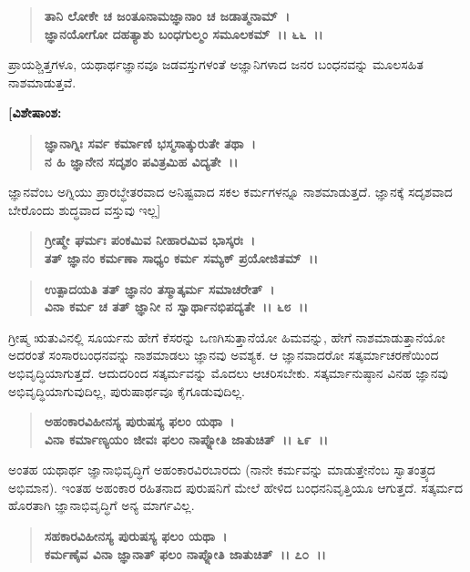 \begin{verse}
\textbf{ತಾನಿ ಲೋಕೇ ಚ ಜಂತೂನಾಮಜ್ಞಾನಾಂ ಚ ಜಡಾತ್ಮನಾಮ್~।}\\\textbf{ಜ್ಞಾನಯೋಗೋ ದಹತ್ಯಾಶು ಬಂಧಗುಲ್ಮಂ ಸಮೂಲಕಮ್~।। ೬೬~।।}
\end{verse}

ಪ್ರಾಯಶ್ಚಿತ್ತಗಳೂ, ಯಥಾರ್ಥಜ್ಞಾನವೂ ಜಡವಸ್ತುಗಳಂತೆ ಅಜ್ಞಾನಿಗಳಾದ ಜನರ ಬಂಧನವನ್ನು ಮೂಲಸಹಿತ ನಾಶಮಾಡುತ್ತವೆ.

\textbf{[ವಿಶೇಷಾಂಶ:}

\begin{verse}
\textbf{ಜ್ಞಾನಾಗ್ನಿಃ ಸರ್ವ ಕರ್ಮಾಣಿ ಭಸ್ಮಸಾತ್ಕುರುತೇ ತಥಾ~।}\\\textbf{ನ ಹಿ ಜ್ಞಾನೇನ ಸದೃಶಂ ಪವಿತ್ರಮಿಹ ವಿದ್ಯತೇ~।।} 
\end{verse}

ಜ್ಞಾನವೆಂಬ ಅಗ್ನಿಯು ಪ್ರಾರಬ್ಧೇತರವಾದ ಅನಿಷ್ಟವಾದ ಸಕಲ ಕರ್ಮಗಳನ್ನೂ ನಾಶಮಾಡುತ್ತದೆ. ಜ್ಞಾನಕ್ಕೆ ಸದೃಶವಾದ ಬೇರೊಂದು ಶುದ್ಧವಾದ ವಸ್ತುವು ಇಲ್ಲ]

\begin{verse}
\textbf{ಗ್ರೀಷ್ಮೇ ಘರ್ಮಃ ಪಂಕಮಿವ ನೀಹಾರಮಿವ ಭಾಸ್ಕರಃ~।}\\\textbf{ತತ್ ಜ್ಞಾನಂ ಕರ್ಮಣಾ ಸಾಧ್ಯಂ ಕರ್ಮ ಸಮ್ಯಕ್ ಪ್ರಯೋಜಿತಮ್~।। }
\end{verse}

\begin{verse}
\textbf{ಉತ್ಪಾದಯತಿ ತತ್ ಜ್ಞಾನಂ ತಸ್ಮಾತ್ಕರ್ಮ ಸಮಾಚರೇತ್~।}\\\textbf{ವಿನಾ ಕರ್ಮ ಚ ತತ್ ಜ್ಞಾನೀ ನ ಸ್ವಾರ್ಥಾನಭಿಪದ್ಯತೇ~।। ೬೮~।।}
\end{verse}

ಗ್ರೀಷ್ಮ ಋತುವಿನಲ್ಲಿ ಸೂರ್ಯನು ಹೇಗೆ ಕೆಸರನ್ನು ಒಣಗಿಸುತ್ತಾನೆಯೋ ಹಿಮವನ್ನು, ಹೇಗೆ ನಾಶಮಾಡುತ್ತಾನೆಯೋ ಅದರಂತೆ ಸಂಸಾರಬಂಧನವನ್ನು ನಾಶಮಾಡಲು ಜ್ಞಾನವು ಅವಶ್ಯಕ. ಆ ಜ್ಞಾನವಾದರೋ ಸತ್ಕರ್ಮಾಚರಣೆಯಿಂದ ಅಭಿವೃದ್ಧಿಯಾಗುತ್ತದೆ. ಆದುದರಿಂದ ಸತ್ಕರ್ಮವನ್ನು ಮೊದಲು ಆಚರಿಸಬೇಕು. ಸತ್ಕರ್ಮಾನುಷ್ಠಾನ ವಿನಹ ಜ್ಞಾನವು ಅಭಿವೃದ್ಧಿಯಾಗುವುದಿಲ್ಲ, ಪುರುಷಾರ್ಥವೂ ಕೈಗೂಡುವುದಿಲ್ಲ.

\begin{verse}
\textbf{ಅಹಂಕಾರವಿಹೀನಸ್ಯ ಪುರುಷಸ್ಯ ಫಲಂ ಯಥಾ~।}\\\textbf{ವಿನಾ ಕರ್ಮಾಣ್ಯಯಂ ಜೀವಃ ಫಲಂ ನಾಪ್ನೋತಿ ಜಾತುಚಿತ್~।। ೬೯~।।}
\end{verse}

ಅಂತಹ ಯಥಾರ್ಥ ಜ್ಞಾನಾಭಿವೃದ್ಧಿಗೆ ಅಹಂಕಾರವಿರಬಾರದು (ನಾನೇ ಕರ್ಮವನ್ನು ಮಾಡುತ್ತೇನೆಂಬ ಸ್ವಾತಂತ್ರ್ಯದ ಅಭಿಮಾನ). ಇಂತಹ ಅಹಂಕಾರ ರಹಿತನಾದ ಪುರುಷನಿಗೆ ಮೇಲೆ ಹೇಳಿದ ಬಂಧನನಿವೃತ್ತಿಯೂ ಆಗುತ್ತದೆ. ಸತ್ಕರ್ಮದ ಹೊರತಾಗಿ ಜ್ಞಾನಾಭಿವೃದ್ಧಿಗೆ ಅನ್ಯ ಮಾರ್ಗವಿಲ್ಲ.

\begin{verse}
\textbf{ಸಹಕಾರವಿಹೀನಸ್ಯ ಪುರುಷಸ್ಯ ಫಲಂ ಯಥಾ~।}\\\textbf{ಕರ್ಮಣೈವ ವಿನಾ ಜ್ಞಾನಾತ್ ಫಲಂ ನಾಪ್ನೋತಿ ಜಾತುಚಿತ್~।। ೭೦~।।}
\end{verse}

